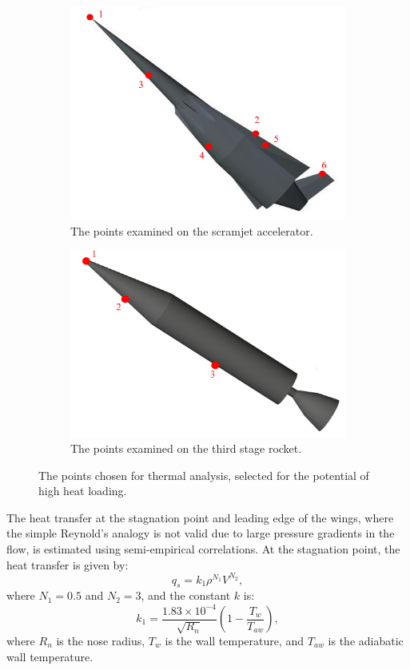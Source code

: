 \begin{figure}[!ht]
	
\begin{subfigure}{.5\textwidth}
	\centering
\includegraphics[width=0.9\linewidth]{figures/A1_uncertainty-analysis/Q_pos}
\caption{The points examined on the scramjet accelerator.}
\end{subfigure}
\begin{subfigure}{.5\textwidth}
	\centering
\includegraphics[width=0.9\linewidth]{figures/A1_uncertainty-analysis/Q_pos3}
\caption{The points examined on the third stage rocket.}
\end{subfigure}
\caption{The points chosen for thermal analysis, selected for the potential of high heat loading.}
\label{fig:Q_pos}
\end{figure}

The heat transfer at the stagnation point and leading edge of the wings, where the simple Reynold's analogy is not valid due to large pressure gradients in the flow\cite{HypersonicGas}, is estimated using semi-empirical correlations\cite{Dirkx}. At the stagnation point, the heat transfer is given by\cite{Dirkx}:
\begin{equation}
q_s = k_1\rho^{N_1}V^{N_2},
\end{equation}
where $N_1 = 0.5$ and $N_2 = 3$, and the constant $k$ is\cite{Dirkx}:
\begin{equation}
k_1 = \frac{1.83 \times 10^{-4}}{\sqrt{R_n}}(1-\frac{T_w}{T_{aw}}),
\end{equation}
where $R_n$ is the nose radius, $T_w$ is the wall temperature, and $T_{aw}$ is the adiabatic wall temperature.

